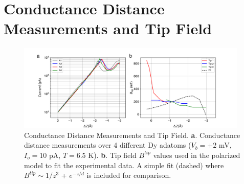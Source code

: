 \documentclass[reprint,amsmath,amssymb,aps,nofootinbib,onecolumn]{revtex4-2}
\begin{document}
\section{Conductance Distance Measurements and Tip Field}
\label{sec:cond-dist}
\begin{figure}[ht!]
\includegraphics[width=0.98\textwidth]{fields_fit2.pdf}
\caption{Conductance Distance Measurements and Tip Field. \textbf{a}. Conductance distance measurements over 4 different Dy adatoms ($V_{b} = +2$ mV,$I_o = 10$ pA, $T = 6.5$ K). \textbf{b}. Tip field $B^{tip}$ values used in the polarized model to fit the experimental data. A simple fit (dashed) where $B^{tip} \sim 1/z^{3}$ + $e^{-z/d}$ is included for comparison. 
\label{fig:fields} }
\end{figure}
\end{document}

